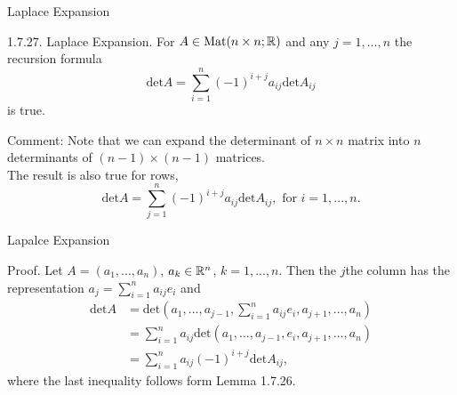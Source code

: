 \documentclass[hyperref={pdfpagelabels=true}]{beamer}
\newcommand{\Mat}{\text{Mat}}
\newcommand{\<}{\langle}
\renewcommand{\>}{\rangle}
\begin{document}
        \begin{frame}{Laplace Expansion}
            \begin{block}{1.7.27. Laplace Expansion.}
                For $A \in \Mat(n \times n;\R)$ and any $j = 1,...,n$ the recursion formula
                \[\text{det}A = \sum_{i = 1}^{n}(-1)^{i+j}a_{ij}\text{det}A_{ij}\]
                is true.
            \end{block}
            \begin{block}{Comment:}
                Note that we can expand the determinant of $n \times n$ matrix into $n$ determinants of $(n-1) \times (n-1)$ matrices.\\
                The result is also true for rows,
                \[\text{det}A = \sum_{j = 1}^{n}(-1)^{i+j}a_{ij}\text{det}A_{ij}, \text{ for }i = 1,...,n.\]
            \end{block}
        \end{frame}
        \begin{frame}{Lapalce Expansion}
            \begin{block}{Proof.}
                Let $A = (a_{1},...,a_{n})$, $a_{k} \in \mathbb{R}^{n}$, $k = 1,...,n$. Then the $j$the column has the representation $a_{j} = \sum_{i = 1}^{n}a_{ij}e_{i}$ and 
                \[
                    \begin{aligned}
                        \text{det}A &= \text{det}(a_{1},...,a_{j-1},\sum_{i = 1}^{n}a_{ij}e_{i},a_{j+1},...,a_{n})\\
                        &= \sum_{i = 1}^{n}a_{ij}\text{det}(a_{1},...,a_{j-1},e_{i},a_{j+1},...,a_{n})\\
                        &= \sum_{i = 1}^{n}a_{ij}(-1)^{i+j}\text{det}A_{ij},
                    \end{aligned}
                \]
                where the last inequality follows form Lemma 1.7.26.
                \end{block}
            \end{frame}
\end{document}

